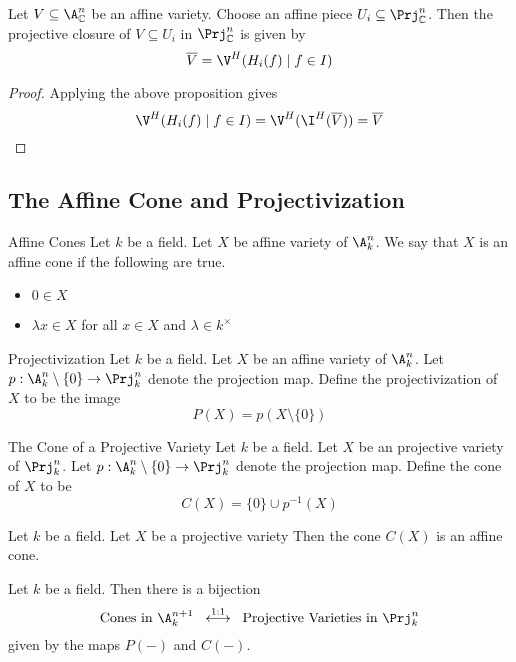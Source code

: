 \documentclass[a4paper]{article}
\begin{document}
\begin{crl}{}{} Let $V\subseteq\A_\C^n$ be an affine variety. Choose an affine piece $U_i\subseteq\Prj_\C^n$. Then the projective closure of $V\subseteq U_i$ in $\Prj_\C^n$ is given by $$\overline{V}=\V^H(H_i(f)\;|\;f\in I)$$ 
\begin{proof}
Applying the above proposition gives $$\V^H(H_i(f)\;|\;f\in I)=\V^H(\I^H(\overline{V}))=\overline{V}$$
\end{proof}
\end{crl}

\subsection{The Affine Cone and Projectivization}
\begin{defn}{Affine Cones}{} Let $k$ be a field. Let $X$ be affine variety of $\A_k^n$. We say that $X$ is an affine cone if the following are true. 
\begin{itemize}
\item $0\in X$
\item $\lambda x\in X$ for all $x\in X$ and $\lambda\in k^\times$
\end{itemize}
\end{defn}

\begin{defn}{Projectivization}{} Let $k$ be a field. Let $X$ be an affine variety of $\A_k^n$. Let $p:\A_k^n\setminus\{0\}\to\Prj_k^n$ denote the projection map. Define the projectivization of $X$ to be the image $$P(X)=p(X\setminus\{0\})$$
\end{defn}

\begin{defn}{The Cone of a Projective Variety}{} Let $k$ be a field. Let $X$ be an projective variety of $\Prj_k^n$. Let $p:\A_k^n\setminus\{0\}\to\Prj_k^n$ denote the projection map. Define the cone of $X$ to be $$C(X)=\{0\}\cup p^{-1}(X)$$
\end{defn}

\begin{lmm}{}{} Let $k$ be a field. Let $X$ be a projective variety Then the cone $C(X)$ is an affine cone. 
\end{lmm}

\begin{prp}{}{} Let $k$ be a field. Then there is a bijection $$\text{Cones in }\A_k^{n+1}\;\;\overset{1:1}{\longleftrightarrow}\;\;\text{Projective Varieties in }\Prj_k^n$$ given by the maps $P(-)$ and $C(-)$. 
\end{prp}
\end{document}
